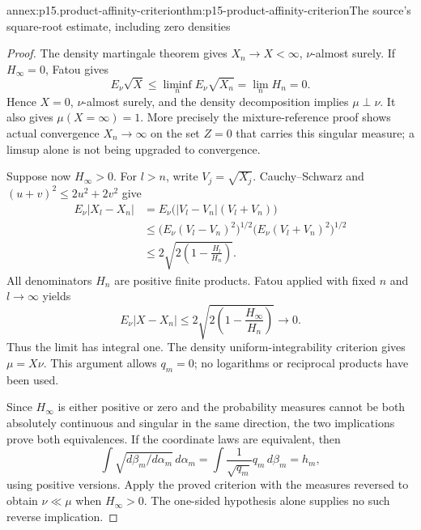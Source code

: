 \begin{annexitem}{annex:p15.product-affinity-criterion}{thm:p15-product-affinity-criterion}{The source's square-root estimate, including zero densities}
\begin{proof}
The density martingale theorem gives \(X_n\to X<\infty\),
\(\nu\)-almost surely. If \(H_\infty=0\), Fatou gives
\[
                  E_\nu\sqrt X
                     \leq\liminf_nE_\nu\sqrt{X_n}
                     =\lim_nH_n=0.
\]
Hence \(X=0\), \(\nu\)-almost surely, and the density decomposition
implies \(\mu\perp\nu\).
It also gives \(\mu(X=\infty)=1\). More precisely the mixture-reference
proof shows actual convergence \(X_n\to\infty\) on the set \(Z=0\)
that carries this singular measure; a limsup alone is not being
upgraded to convergence.

Suppose now \(H_\infty>0\). For \(l>n\), write \(V_j=\sqrt{X_j}\).
Cauchy--Schwarz and \((u+v)^2\leq2u^2+2v^2\) give
\[
 \begin{aligned}
 E_\nu|X_l-X_n|
 &=E_\nu\bigl(|V_l-V_n|(V_l+V_n)\bigr)\\
 &\leq\bigl(E_\nu(V_l-V_n)^2\bigr)^{1/2}
        \bigl(E_\nu(V_l+V_n)^2\bigr)^{1/2}\\
 &\leq2\sqrt{2\left(1-\frac{H_l}{H_n}\right)}.
 \end{aligned}
\]
All denominators \(H_n\) are positive finite products.
Fatou applied with fixed \(n\) and \(l\to\infty\) yields
\[
             E_\nu|X-X_n|
                  \leq2\sqrt{2\left(1-\frac{H_\infty}{H_n}\right)}
                  \longrightarrow0.
\]
Thus the limit has integral one. The density uniform-integrability
criterion gives \(\mu=X\nu\). This argument allows \(q_m=0\);
no logarithms or reciprocal products have been used.

Since \(H_\infty\) is either positive or zero and the probability
measures cannot be both absolutely continuous and singular in the same
direction, the two implications prove both equivalences.
If the coordinate laws are equivalent, then
\[
 \int\sqrt{d\beta_m/d\alpha_m}\,d\alpha_m
       =\int\frac{1}{\sqrt{q_m}}q_m\,d\beta_m=h_m,
\]
using positive versions. Apply the proved criterion with the measures
reversed to obtain \(\nu\ll\mu\) when \(H_\infty>0\).
The one-sided hypothesis alone supplies no such reverse implication.
\end{proof}
\end{annexitem}


